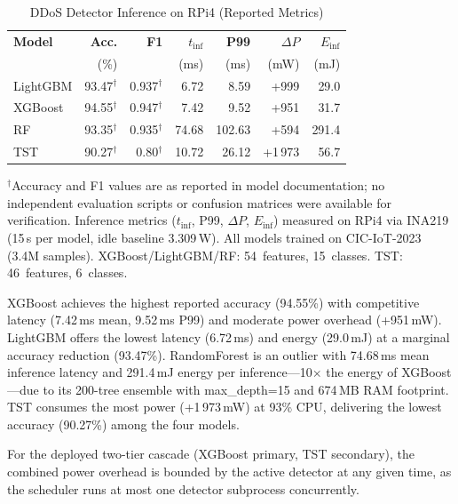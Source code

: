 \begin{table}[t]
\centering
\caption{DDoS Detector Inference on RPi4 (Reported Metrics)}
\label{tab:detector_compare}
\footnotesize
\begin{tabular}{@{}lrrrrrr@{}}
\toprule
\textbf{Model} &
  \textbf{Acc.} & \textbf{F1} &
  \textbf{$t_\text{inf}$} & \textbf{P99} &
  \textbf{$\Delta P$} & \textbf{$E_\text{inf}$} \\
& (\%) & & (ms) & (ms) & (mW) & (mJ) \\
\midrule
LightGBM & 93.47$^\dagger$ & 0.937$^\dagger$ & 6.72  & 8.59   & +999  & 29.0  \\
XGBoost  & 94.55$^\dagger$ & 0.947$^\dagger$ & 7.42  & 9.52   & +951  & 31.7  \\
RF       & 93.35$^\dagger$ & 0.935$^\dagger$ & 74.68 & 102.63 & +594  & 291.4 \\
TST      & 90.27$^\dagger$ & 0.80$^\dagger$  & 10.72 & 26.12  & +1\,973 & 56.7 \\
\bottomrule
\end{tabular}
\begin{tablenotes}
\footnotesize
\item $^\dagger$Accuracy and F1 values are as reported in model documentation;
  no independent evaluation scripts or confusion matrices were available
  for verification.  Inference metrics ($t_\text{inf}$, P99, $\Delta P$,
  $E_\text{inf}$) measured on RPi4 via INA219 (15\,s per model,
  idle baseline 3.309\,W).
  All models trained on CIC-IoT-2023 (3.4M samples).
  XGBoost/LightGBM/RF: 54~features, 15~classes.  TST: 46~features, 6~classes.
\end{tablenotes}
\end{table}

XGBoost achieves the highest reported accuracy (94.55\%) with
competitive latency (7.42\,ms mean, 9.52\,ms P99) and moderate power
overhead (+951\,mW).  LightGBM offers the lowest latency (6.72\,ms)
and energy (29.0\,mJ) at a marginal accuracy reduction (93.47\%).
RandomForest is an outlier with 74.68\,ms mean inference latency and
291.4\,mJ energy per inference—10$\times$ the energy of XGBoost—due
to its 200-tree ensemble with max\_depth=15 and 674\,MB RAM footprint.
TST consumes the most power (+1\,973\,mW) at 93\% CPU, delivering the
lowest accuracy (90.27\%) among the four models.

For the deployed two-tier cascade (XGBoost primary, TST secondary),
the combined power overhead is bounded by the active detector at any
given time, as the scheduler runs at most one detector subprocess
concurrently.

